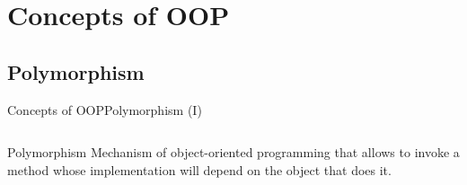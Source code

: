 \documentclass[10pt,compress]{beamer} %
\begin{document}
\section{Concepts of OOP}
\subsection{Polymorphism}

\begin{frame}{Concepts of OOP}{Polymorphism (I)}
    \begin{columns}

	\begin{block}{Polymorphism}
		Mechanism of object-oriented programming that allows to invoke a method whose implementation will depend on the object that does it.
  	\end{block}	




    \end{columns}

\end{frame}
\end{document}
